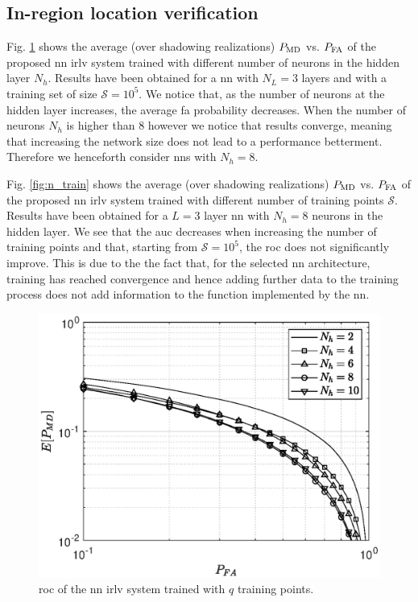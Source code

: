 \documentclass[conference,final]{IEEEtran}
\begin{document}
\subsection{In-region location verification}
Fig. \ref{fig:n_neur} shows the average (over shadowing realizations) $P_{\rm MD}$ vs. $P_{\rm FA}$ of the proposed \ac{nn} \ac{irlv} system  trained with different number of neurons in the hidden layer $N_h$. Results have been obtained for a \ac{nn} with $N_L=3$ layers and with a training set of size $\mathcal{S}= 10^5$. We notice that, as the number of neurons at the hidden layer increases, the average \ac{fa} probability decreases. When the number of neurons $N_h$ is higher than $8$ however we notice that results converge, meaning that increasing the network size does not lead to a performance betterment. Therefore we henceforth consider \acp{nn} with $N_h=8$.

Fig. \ref{fig:n_train} shows the average (over shadowing realizations) $P_{\rm MD}$ vs. $P_{\rm FA}$ of the proposed \ac{nn} \ac{irlv} system  trained with different number of training points $\mathcal{S}$. Results have been obtained for a $L=3$ layer \ac{nn} with $N_h=8$ neurons in the hidden layer. We see that the \ac{auc} decreases when increasing the number of training points and that, starting from $\mathcal{S}=10^5$, the \ac{roc} does not significantly improve. This is due to the the fact that, for the selected \ac{nn} architecture, training has reached convergence and hence adding further data to the training process does not add information to the function implemented by the \ac{nn}. 

\begin{figure}[t]
    \centering
    \includegraphics[width=1\columnwidth]{res_avg_nNeur_1e5.eps}
    \caption{\ac{roc} of the \ac{nn} \ac{irlv} system trained with $q$ training points.}
    \label{fig:n_neur}
\end{figure}
\end{document}
